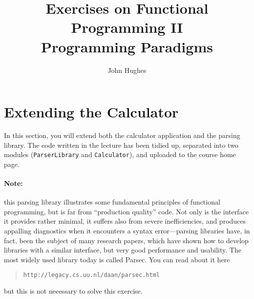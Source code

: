 \documentclass{article}
\begin{document}
\title{Exercises on Functional Programming II\\
  \large Programming Paradigms}
\author{John Hughes}
\maketitle

\newcommand{\answer}[1]{} %
\newcommand{\percent}[1]{} %
\section{Extending the Calculator}
\percent{20}
In this section, you will extend both the calculator application and
the parsing library. The code written in the lecture has been tidied
up, separated into two modules (\verb!ParserLibrary! and
\verb!Calculator!), and uploaded to the course home page.

\paragraph{Note:} this parsing library illustrates some fundamental
principles of functional programming, but is far from ``production
quality'' code. Not only is the interface it provides rather minimal,
it suffers also from severe inefficiencies, and produces appalling
diagnostics when it encounters a syntax error---parsing libraries
have, in fact, been the subject of many research papers, which have
shown how to develop libraries with a similar interface, but very good
performance and usability. The most widely used library today is
called Parsec. You can read about it here
\begin{quote}
\verb!http://legacy.cs.uu.nl/daan/parsec.html!
\end{quote}
but this is not necessary to solve this exercise.
\end{document}
